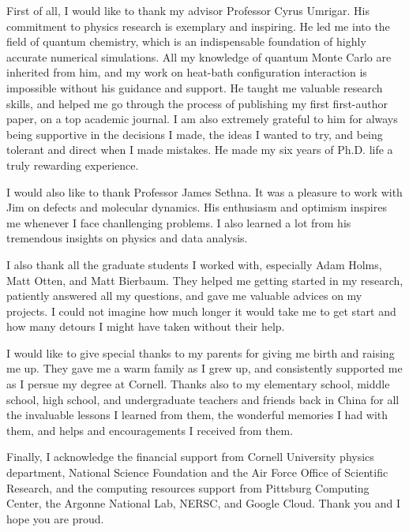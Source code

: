 \documentclass[phd,tocprelim]{cornell}
\begin{document}
\begin{acknowledgements}
First of all, I would like to thank my advisor Professor Cyrus Umrigar.
His commitment to physics research is exemplary and inspiring.
He led me into the field of quantum chemistry, which is an indispensable foundation of highly accurate numerical simulations.
All my knowledge of quantum Monte Carlo are inherited from him, and my work on heat-bath configuration interaction is impossible without his guidance and support.
He taught me valuable research skills, and helped me go through the process of publishing my first first-author paper, on a top academic journal.
I am also extremely grateful to him for always being supportive in the decisions I made, the ideas I wanted to try, and being tolerant and direct when I made mistakes.
He made my six years of Ph.D. life a truly rewarding experience.

I would also like to thank Professor James Sethna.
It was a pleasure to work with Jim on defects and molecular dynamics.
His enthusiasm and optimism inspires me whenever I face chanllenging problems.
I also learned a lot from his tremendous insights on physics and data analysis.

I also thank all the graduate students I worked with, especially Adam Holms, Matt Otten, and Matt Bierbaum.
They helped me getting started in my research, patiently answered all my questions, and gave me valuable advices on my projects.
I could not imagine how much longer it would take me to get start and how many detours I might have taken without their help.

I would like to give special thanks to my parents for giving me birth and raising me up.
They gave me a warm family as I grew up, and consistently supported me as I persue my degree at Cornell.
Thanks also to my elementary school, middle school, high school, and undergraduate teachers and friends back in China for all the invaluable lessons I learned from them, the wonderful memories I had with them, and helps and encouragements I received from them.

Finally, I acknowledge the financial support from Cornell University physics department, National Science Foundation and the Air Force Office of Scientific Research, and the computing resources support from Pittsburg Computing Center, the Argonne National Lab, NERSC, and Google Cloud.
Thank you and I hope you are proud.
\end{acknowledgements}

\contentspage
\tablelistpage
\figurelistpage
\end{document}
